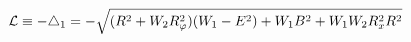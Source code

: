 \begin{equation}
\label{lag1}
{\cal L} \equiv -\bigtriangleup_1 = 
- \sqrt{(R^2 + W_2 R_{\varphi}^2) (W_1 - E^2) + W_1 B^2 + W_1 W_2 R_x^2 R^2}
\end{equation}

